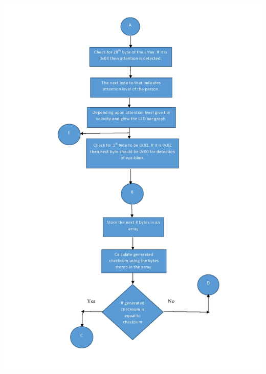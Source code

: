 \documentclass[12pt]{article}
\begin{document}
\begin{enumerate}
\begin{center}
	\includegraphics[width=19cm, height=24cm]{Flowchart2}
\end{center}
\begin{center}
	\graphicspath{ {images/} }

\end{center}
\end{enumerate}
\end{document}
